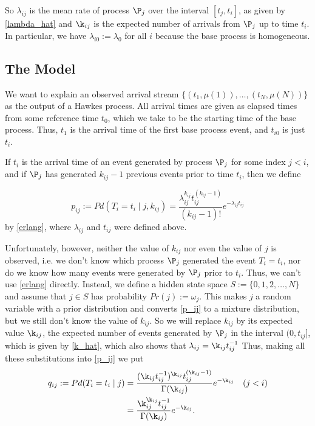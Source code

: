 \documentclass[12pt,leqno]{article}
\begin{document}
So $\lambda_{ij}$ is the mean rate of process $\P_j$ over
the interval $[t_j,t_i]$, as given by \eqref{lambda_hat} and $\k_{ij}$ is the expected number
of arrivals from $\P_j$ up to time $t_i$.  In particular, we have
  $\lambda_{i0} := \lambda_0$ for all $i$ because the base process is homogeneous.
  
\subsection{The Model}
We want to explain an observed arrival stream $\{(t_1,\mu(1)),\dots,(t_N,\mu(N))\}$ as the output
of a Hawkes process.  All arrival times are given as elapsed times from some reference time $t_0$,
which we take to be the starting time of the base process.  Thus, $t_1$ is the arrival time of the first
base process event, and $t_{i0}$ is just $t_i$.

If $t_i$ is the arrival time of an event generated by process $\P_j$ for some index $j < i$, and
if $\P_j$ has generated $k_{ij}-1$ previous events prior to time $t_i$, then we define 

\begin{equation}\label{p_ij}
  p_{ij} :=  Pd(T_i = t_i \mid j, k_{ij}) = \frac{\lambda_{ij}^{k_{ij}}t_{ij}^{(k_{ij}-1)}}{(k_{ij}-1)!}e^{-\lambda_{ij}t_{ij}}
\end{equation}
by \eqref{erlang}, where $\lambda_{ij}$ and $t_{ij}$ were defined above.

Unfortunately, however, neither the value of $k_{ij}$ nor even the value of $j$ is  observed, i.e. we don't know
which process $\P_j$ generated the event $T_i = t_i$, nor do we know how many events were generated by $\P_j$
prior to $t_i$.  Thus, we can't use \eqref{erlang} directly. Instead,
we define a hidden state space $S := \{0,1,2,\dots,N\}$ and assume that $j\in{S}$ has probability $Pr(j) := \omega_j$.
This makes $j$ a random variable with a prior distribution and converts \eqref{p_ij} to a mixture distribution, but
we still don't know the value of $k_{ij}$.  So we
will replace $k_{ij}$ by its expected value $\k_{ij}$, the expected number of events generated by $\P_j$
in the interval $(0,t_{ij}]$, which is  given by \eqref{k_hat}, which also shows that $\lambda_{ij} = \k_{ij}t_{ij}^{-1}$
Thus, making all these substitutions into \eqref{p_ij} we put
\begin{equation}\label{q_ij}
  \begin{split}
    q_{ij} := Pd(T_i = t_i \mid j) &= \frac{(\k_{ij}t_{ij}^{-1})^{\k_{ij}}t_{ij}^{(\k_{ij}-1)}}{\Gamma(\k_{ij})}e^{-\k_{ij}}\quad (j < i)\\
    &= \frac{\k_{ij}^{\k_{ij}}t_{ij}^{-1}}{\Gamma(\k_{ij})}e^{-\k_{ij}}.
  \end{split}
\end{equation}
\end{document}
